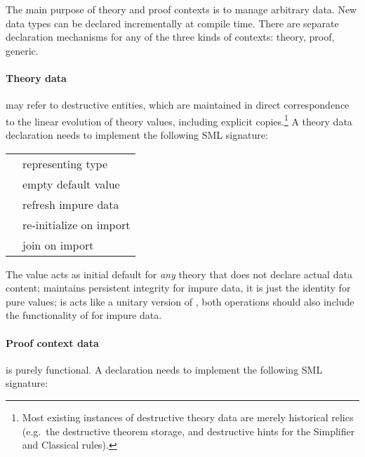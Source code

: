 \begin{isabellebody}
\begin{isamarkuptext}
\begin{description}
  \end{description}%
\end{isamarkuptext}%
\isamarkuptrue%
%
\endisatagmlref
{\isafoldmlref}%
%
\isadelimmlref
%
\endisadelimmlref
%
\isamarkuptrue%
%
\begin{isamarkuptext}%
The main purpose of theory and proof contexts is to manage arbitrary
  data.  New data types can be declared incrementally at compile time.
  There are separate declaration mechanisms for any of the three kinds
  of contexts: theory, proof, generic.

  \paragraph{Theory data} may refer to destructive entities, which are
  maintained in direct correspondence to the linear evolution of
  theory values, including explicit copies.\footnote{Most existing
  instances of destructive theory data are merely historical relics
  (e.g.\ the destructive theorem storage, and destructive hints for
  the Simplifier and Classical rules).}  A theory data declaration
  needs to implement the following SML signature:

  \medskip
  \begin{tabular}{ll}
  \isa{{\isasymtype}\ T} & representing type \\
  \isa{{\isasymval}\ empty{\isacharcolon}\ T} & empty default value \\
  \isa{{\isasymval}\ copy{\isacharcolon}\ T\ {\isasymrightarrow}\ T} & refresh impure data \\
  \isa{{\isasymval}\ extend{\isacharcolon}\ T\ {\isasymrightarrow}\ T} & re-initialize on import \\
  \isa{{\isasymval}\ merge{\isacharcolon}\ T\ {\isasymtimes}\ T\ {\isasymrightarrow}\ T} & join on import \\
  \end{tabular}
  \medskip

  \noindent The  value acts as initial default for
  \emph{any} theory that does not declare actual data content;  maintains persistent integrity for impure data, it is just
  the identity for pure values;  is acts like a
  unitary version of , both operations should also
  include the functionality of  for impure data.

  \paragraph{Proof context data} is purely functional.  A declaration
  needs to implement the following SML signature:


\end{isamarkuptext}
\end{isabellebody}
